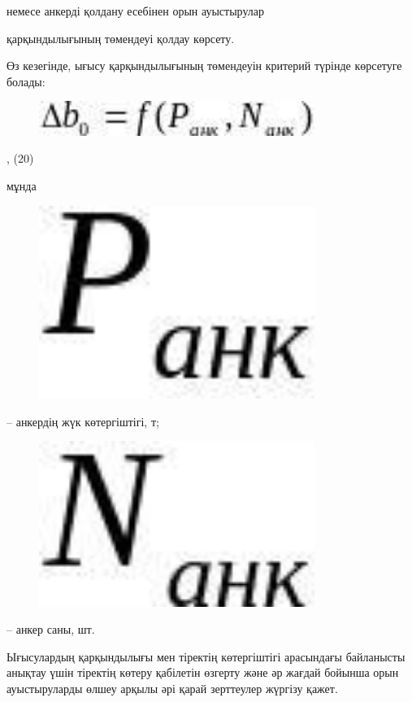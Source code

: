 немесе анкерді қолдану есебінен орын ауыстырулар

қарқындылығының төмендеуі қолдау көрсету.

Өз кезегінде, ығысу қарқындылығының төмендеуін критерий түрінде
көрсетуге болады:

\begin{figure}[H]
	\centering
	\includegraphics[width=0.8\textwidth]{assets/1330}
	\caption*{}
\end{figure}, (20)

мұнда \begin{figure}[H]
	\centering
	\includegraphics[width=0.8\textwidth]{assets/1331}
	\caption*{}
\end{figure} -- анкердің жүк көтергіштігі,
т;

\begin{figure}[H]
	\centering
	\includegraphics[width=0.8\textwidth]{assets/1332}
	\caption*{}
\end{figure} -- анкер саны, шт.

Ығысулардың қарқындылығы мен тіректің көтергіштігі арасындағы байланысты
анықтау үшін тіректің көтеру қабілетін өзгерту және әр жағдай бойынша
орын ауыстыруларды өлшеу арқылы әрі қарай зерттеулер жүргізу қажет.

